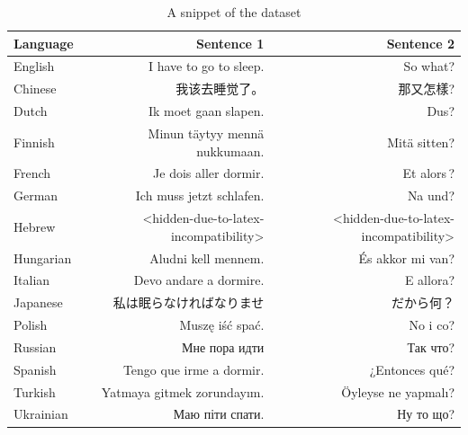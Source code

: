 \documentclass[a4paper, 11pt]{article}
\begin{document}
\begin{CJK}{UTF8}{gbsn}
    \begin{table}[htbp]
        \centering
        \begin{tabular}{lrr}
            \hline
            \textbf{Language} & \textbf{Sentence 1}                   & \textbf{Sentence 2}                   \\
            \hline
            English           & I have to go to sleep.                & So what?                              \\
            Chinese           & 我该去睡觉了。                               & 那又怎樣?                                 \\
            Dutch             & Ik moet gaan slapen.                  & Dus?                                  \\
            Finnish           & Minun täytyy mennä nukkumaan.         & Mitä sitten?                          \\
            French            & Je dois aller dormir.                 & Et alors ?                            \\
            German            & Ich muss jetzt schlafen.              & Na und?                               \\
            Hebrew            & <hidden-due-to-latex-incompatibility> & <hidden-due-to-latex-incompatibility> \\
            Hungarian         & Aludni kell mennem.                   & És akkor mi van?                      \\
            Italian           & Devo andare a dormire.                & E allora?                             \\
            Japanese          & 私は眠らなければなりませ                          & だから何？                                 \\
            Polish            & Muszę iść spać.                       & No i co?                              \\
            Russian           & Мне пора идти                         & Так что?                              \\
            Spanish           & Tengo que irme a dormir.              & ¿Entonces qué?                        \\
            Turkish           & Yatmaya gitmek zorundayım.            & Öyleyse ne yapmalı?                   \\
            Ukrainian         & Маю піти спати.                       & Ну то що?                             \\
            \hline
        \end{tabular}
        \caption{A snippet of the dataset}
        \label{table:parallel_sentence}
    \end{table}
\end{CJK}
\end{document}
